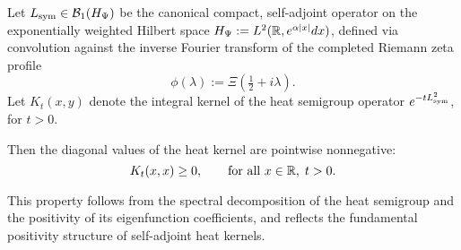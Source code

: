 \begin{lemma}
\label{lem:heat_kernel_diagonal_positivity}
Let \( L_{\mathrm{sym}} \in \mathcal{B}_1(H_{\Psi}) \) be the canonical compact, self-adjoint operator on the exponentially weighted Hilbert space \( H_{\Psi} := L^2(\mathbb{R}, e^{\alpha |x|} dx) \), defined via convolution against the inverse Fourier transform of the completed Riemann zeta profile
\[
\phi(\lambda) := \Xi\left(\tfrac{1}{2} + i\lambda\right).
\]
Let \( K_t(x, y) \) denote the integral kernel of the heat semigroup operator \( e^{-t L_{\mathrm{sym}}^2} \), for \( t > 0 \).

\medskip
\noindent
Then the diagonal values of the heat kernel are pointwise nonnegative:
\[
K_t(x,x) \geq 0, \qquad \text{for all } x \in \mathbb{R}, \; t > 0.
\]

\medskip
\noindent
This property follows from the spectral decomposition of the heat semigroup and the positivity of its eigenfunction coefficients, and reflects the fundamental positivity structure of self-adjoint heat kernels.
\end{lemma}
